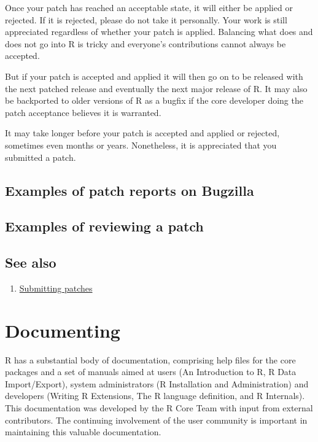 \documentclass[
  letterpaper,
  DIV=11,
  numbers=noendperiod]{scrreprt}
\providecommand{\tightlist}{%
  \setlength{\itemsep}{0pt}\setlength{\parskip}{0pt}}\usepackage{longtable,booktabs,array}
\begin{document}
Once your patch has reached an acceptable state, it will either be
applied or rejected. If it is rejected, please do not take it
personally. Your work is still appreciated regardless of whether your
patch is applied. Balancing what does and does not go into R is tricky
and everyone's contributions cannot always be accepted.

But if your patch is accepted and applied it will then go on to be
released with the next patched release and eventually the next major
release of R. It may also be backported to older versions of R as a
bugfix if the core developer doing the patch acceptance believes it is
warranted.

It may take longer before your patch is accepted and applied or
rejected, sometimes even months or years. Nonetheless, it is appreciated
that you submitted a patch.

\section{Examples of patch reports on
Bugzilla}\label{examples-of-patch-reports-on-bugzilla}

\section{Examples of reviewing a
patch}\label{examples-of-reviewing-a-patch}

\section{See also}\label{see-also-4}

\begin{enumerate}
\def\labelenumi{\arabic{enumi}.}
\tightlist
\item
  \href{https://www.r-project.org/bugs.html\#how-to-submit-patches}{Submitting
  patches}
\end{enumerate}


\chapter{Documenting}\label{Doc}

R has a substantial body of documentation, comprising help files for the
core packages and a set of manuals aimed at users (An Introduction to R,
R Data Import/Export), system administrators (R Installation and
Administration) and developers (Writing R Extensions, The R language
definition, and R Internals). This documentation was developed by the R
Core Team with input from external contributors. The continuing
involvement of the user community is important in maintaining this
valuable documentation.
\end{document}

